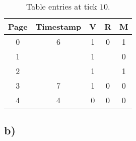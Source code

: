 \documentclass[a4paper,11pt]{report}
\begin{document}
\begin{table}[h]
\centering
\caption{Table entries at tick $10$.}
\label{table:ex3-2}
\begin{tabular}{ccccc}
\hline
\multicolumn{1}{|c|}{\textbf{Page}} & \multicolumn{1}{c|}{\textbf{Timestamp}} & \multicolumn{1}{c|}{\textbf{V}} & \multicolumn{1}{c|}{\textbf{R}} & \multicolumn{1}{c|}{\textbf{M}} \\ \hline
0                                   & 6                                       & 1                               & 0                               & 1                               \\
1                                   & \color{red}{10}                                      & 1                               & \color{red}{0}                              & 0                               \\
2                                   & \color{red}{10}                                      & 1                               & \color{red}{0}                               & 1                               \\
3                                   & 7                                       & 1                               & 0                               & 0                               \\
4                                   & 4                                       & 0                               & 0                               & 0                              
\end{tabular}
\end{table}

\subsection*{b)}
\end{document}
